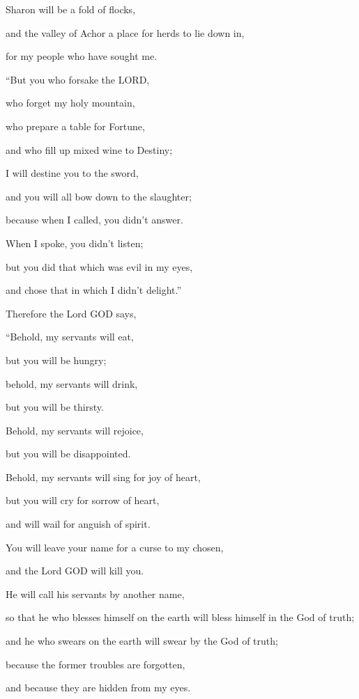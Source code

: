 \myverse{}Sharon will be a fold of flocks,

and the valley of Achor a place for herds to lie down in,

for my people who have sought me.


\vspace{\baselineskip} \myverse{}“But you who forsake the LORD,

who forget my holy mountain,

who prepare a table for Fortune,

and who fill up mixed wine to Destiny;

\myverse{}I will destine you to the sword,

and you will all bow down to the slaughter;

because when I called, you didn’t answer.

When I spoke, you didn’t listen;

but you did that which was evil in my eyes,

and chose that in which I didn’t delight.”


\vspace{\baselineskip} \myverse{}Therefore the Lord GOD says,

“Behold, my servants will eat,

but you will be hungry;

behold, my servants will drink,

but you will be thirsty.

Behold, my servants will rejoice,

but you will be disappointed.

\myverse{}Behold, my servants will sing for joy of heart,

but you will cry for sorrow of heart,

and will wail for anguish of spirit.

\myverse{}You will leave your name for a curse to my chosen,

and the Lord GOD will kill you.

He will call his servants by another name,

\myverse{}so that he who blesses himself on the earth will
bless himself in the God of truth;

and he who swears on the earth will swear by the God of truth;

because the former troubles are forgotten,

and because they are hidden from my eyes.


